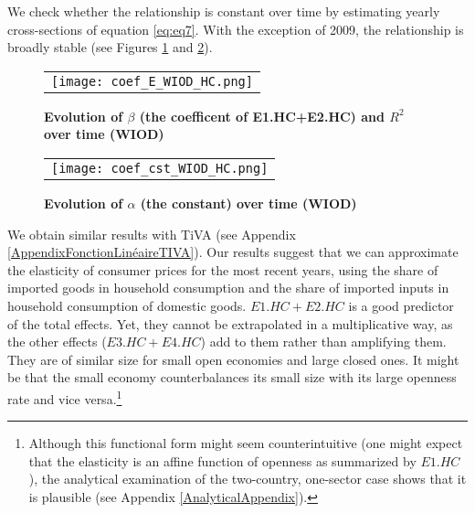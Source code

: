 \documentclass[11pt,a4paper]{article}
\begin{document}
We check whether the relationship is constant over time by estimating yearly cross-sections of equation \ref{eq:eq7}. 
With the exception of 2009, the relationship is broadly stable (see Figures \ref{fig:evolution_b} and \ref{fig:evolution_cst}).

\begin{figure}[!h]
\centering
\caption{\footnotesize{\textbf{Evolution of $\beta$ (the coefficent of E1.HC+E2.HC) and $R^2$ over time (WIOD)}}}
\begin{tabular}{c}
\texttt{[image: coef\_E\_WIOD\_HC.png]}\\
\end{tabular}
\label{fig:evolution_b}
\end{figure}

\begin{figure}[!h]
\centering
\caption{\footnotesize{\textbf{Evolution of $\alpha$ (the constant) over time (WIOD)}}}
\begin{tabular}{c}
\texttt{[image: coef\_cst\_WIOD\_HC.png]}\\
\end{tabular}
\label{fig:evolution_cst}
\end{figure}


We obtain similar results with TiVA (see Appendix \ref{AppendixFonctionLinéaireTIVA}). 
Our results suggest that we can approximate the elasticity of consumer prices for the most recent years, using the share of imported goods in household consumption and the share of imported inputs in household consumption of domestic goods. $E1.HC+E2.HC$ is a good predictor of the total effects.
Yet, they cannot be extrapolated in a multiplicative way, as the other effects ($E3.HC+E4.HC$) add to them rather than amplifying them.
They are of similar size for small open economies and large closed ones.
It might be that the small economy counterbalances its small size with its large openness rate and vice versa.\footnote{Although this functional form might seem counterintuitive (one might expect that the elasticity is an affine function of openness as summarized by $E1.HC$), the analytical examination of the two-country, one-sector case shows that it is plausible (see Appendix \ref{AnalyticalAppendix}).}
\end{document}
